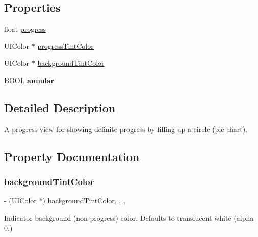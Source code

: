 \subsection*{Properties}
\begin{DoxyCompactItemize}
\item 
float \mbox{\hyperlink{interface_m_b_round_progress_view_af92eeb35944c81f406571bc353dc5d5a}{progress}}
\item 
U\+I\+Color $\ast$ \mbox{\hyperlink{interface_m_b_round_progress_view_a5a14c2e5b5785c25fe9d65befaa60c5c}{progress\+Tint\+Color}}
\item 
U\+I\+Color $\ast$ \mbox{\hyperlink{interface_m_b_round_progress_view_a1bf58145b05298d2baebcc8e00c228b3}{background\+Tint\+Color}}
\item 
\mbox{\label{interface_m_b_round_progress_view_abac11853dafb3f11426dab6d42834f9c}} 
B\+O\+OL {\bfseries annular}
\end{DoxyCompactItemize}


\subsection{Detailed Description}
A progress view for showing definite progress by filling up a circle (pie chart). 

\subsection{Property Documentation}
\mbox{\label{interface_m_b_round_progress_view_a1bf58145b05298d2baebcc8e00c228b3}} 
\subsubsection{\texorpdfstring{background\+Tint\+Color}{backgroundTintColor}}
{\footnotesize\ttfamily -\/ (U\+I\+Color $\ast$) background\+Tint\+Color\hspace{0.3cm}{\ttfamily [read]}, {\ttfamily [write]}, {\ttfamily [nonatomic]}, {\ttfamily [assign]}}

Indicator background (non-\/progress) color. Defaults to translucent white (alpha 0.) \mbox{\label{interface_m_b_round_progress_view_af92eeb35944c81f406571bc353dc5d5a}} 

